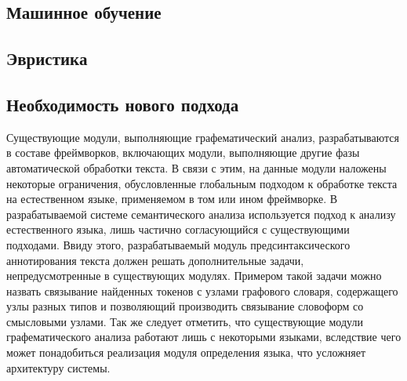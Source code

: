 \subsection{Машинное обучение}
\subsection{Эвристика}

\subsection{Необходимость нового подхода}
Существующие модули, выполняющие графематический анализ, разрабатываются в составе фреймворков, включающих модули, выполняющие другие фазы автоматической обработки текста. В связи с этим, на данные модули наложены некоторые ограничения, обусловленные глобальным подходом к обработке текста на естественном языке, применяемом в том или ином фреймворке. В разрабатываемой системе семантического анализа используется подход к анализу естественного языка, лишь частично согласующийся с существующими подходами. Ввиду этого, разрабатываемый модуль предсинтаксического аннотирования текста должен решать дополнительные задачи, непредусмотренные в существующих модулях. Примером такой задачи можно назвать связывание найденных токенов с узлами графового словаря, содержащего узлы разных типов и позволяющий производить связывание словоформ со смысловыми узлами. Так же следует отметить, что существующие модули графематического анализа работают лишь с некоторыми языками, вследствие чего может понадобиться реализация модуля определения языка, что усложняет архитектуру системы.